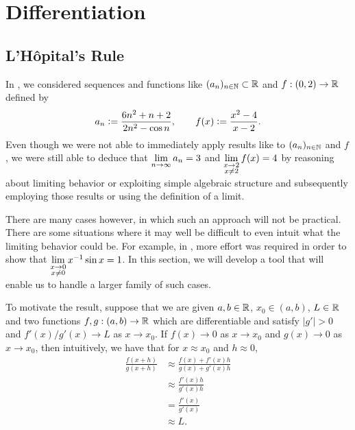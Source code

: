 \documentclass{book}
\begin{document}
	
	
	
	
	
	
	\chapter{Differentiation}
	
	\section{L'H\^opital's Rule}

	In , we considered sequences and functions like $(a_n)_{n \in \mathbb{N}} \subset \mathbb{R}$ and $f:(0,2) \rightarrow \mathbb{R}$ defined by 
	$$a_n \vcentcolon=  \frac{6n^2 + n +2}{2n^2 - \cos n}, \quad \quad f(x) \vcentcolon= \frac{x^2-4}{x-2}.$$ 
	Even though we were not able to immediately apply results like  to $(a_n)_{n \in \mathbb{N}}$ and $f$, we were still able to deduce that $\lim \limits_{n \rightarrow \infty} a_n = 3$ and $\lim\limits_{\substack{x \rightarrow 2 \\ x \neq 2}} f(x) = 4$ by reasoning about limiting behavior or exploiting simple algebraic structure and subsequently employing those results or using the definition of a limit. 
	
	There are many cases however, in which such an approach will not be practical. There are some situations where it may well be difficult to even intuit what the limiting behavior could be. For example, in , more effort was required in order to show that $\lim\limits_{\substack{x \rightarrow 0 \\ x \neq 0}} x^{-1} \sin x = 1$. In this section, we will develop a tool that will enable us to handle a larger family of such cases. 
	
	To motivate the result, suppose that we are given $a,b \in \mathbb{R}$, $x_0 \in (a,b)$, $L \in \mathbb{R}$ and two functions $f,g:(a,b) \rightarrow \mathbb{R}$ which are differentiable and satisfy $|g'| > 0$ and $f'(x)/g'(x) \rightarrow L$ as $x \rightarrow x_0$. If $f(x) \rightarrow 0$ as $x \rightarrow x_0$ and $g(x) \rightarrow 0$ as $x \rightarrow x_0$, then intuitively, we have that for $x \approx x_0$ and $h \approx 0$, 
	\begin{align*}
		\frac{f(x + h)}{g(x + h)}
		& \approx \frac{f(x) + f'(x)h}{g(x) + g'(x)h} \\
		& \approx \frac{f'(x)h}{g'(x)h} \\
		& = \frac{f'(x)}{g'(x)} \\
		& \approx L.
	\end{align*}
	
\end{document}
